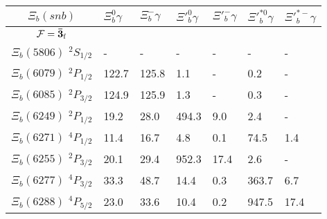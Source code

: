 \begin{tabular}{c |  p{0.65cm}  p{0.65cm}  p{0.65cm}  p{0.65cm}  p{0.65cm}  p{0.65cm}} \hline \hline
$\Xi_b(snb)$  & $\Xi_{b}^{0} \gamma$  & $\Xi_{b}^{-} \gamma$  & $\Xi'^{0}_{b} \gamma$  & $\Xi'^{-}_{b} \gamma$  & $\Xi'^{*0}_{b} \gamma$  & $\Xi'^{*-}_{b} \gamma$  \\ \hline
$\mathcal{F}={\bf {\bar{3}}}_{\rm f}$&&&&&&\\ \hline
$\Xi_b(5806)$ $^{2}S_{1/2}$&-  &-  &-  &-  &-  &- \\
$\Xi_b(6079)$ $^{2}P_{1/2}$&122.7  &125.8  &1.1  &-  &0.2  &- \\
$\Xi_b(6085)$ $^{2}P_{3/2}$&124.9  &125.9  &1.3  &-  &0.3  &- \\
$\Xi_b(6249)$ $^{2}P_{1/2}$&19.2  &28.0  &494.3  &9.0  &2.4  &- \\
$\Xi_b(6271)$ $^{4}P_{1/2}$&11.4  &16.7  &4.8  &0.1  &74.5  &1.4 \\
$\Xi_b(6255)$ $^{2}P_{3/2}$&20.1  &29.4  &952.3  &17.4  &2.6  &- \\
$\Xi_b(6277)$ $^{4}P_{3/2}$&33.3  &48.7  &14.4  &0.3  &363.7  &6.7 \\
$\Xi_b(6288)$ $^{4}P_{5/2}$&23.0  &33.6  &10.4  &0.2  &947.5  &17.4 \\
\hline \hline
\end{tabular}
